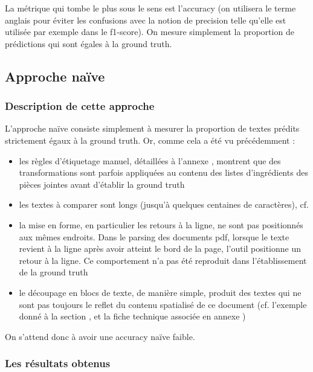         La métrique qui tombe le plus sous le sens est l'accuracy (on utilisera le terme anglais pour éviter les confusions avec la notion de \og precision \fg telle qu'elle est utilisée par exemple dans le f1-score).
        On mesure simplement la proportion de prédictions qui sont égales à la ground truth.

            \subsection{Approche naïve}

                \subsubsection{Description de cette approche}

                L'approche \og naïve \fg consiste simplement à mesurer la proportion de textes prédits strictement égaux à la ground truth.
                Or, comme cela a été vu précédemment : 
                \begin{itemize}
                    \item les règles d'étiquetage manuel, détaillées à l'annexe , montrent que des transformations sont parfois appliquées au contenu des listes d'ingrédients des pièces jointes avant d'établir la ground truth
                    \item les textes à comparer sont longs (jusqu'à quelques centaines de caractères), cf. 
                    \item la mise en forme, en particulier les retours à la ligne, ne sont pas positionnés aux mêmes endroits. Dans le parsing des documents pdf, lorsque le texte revient à la ligne après avoir atteint le bord de la page, l'outil positionne un retour à la ligne. Ce comportement n'a pas été reproduit dans l'établissement de la ground truth
                    \item le découpage en blocs de texte, de manière simple, produit des textes qui ne sont pas toujours le reflet du contenu spatialisé de ce document (cf. l'exemple donné à la section , et la fiche technique associée en annexe )
                \end{itemize}
                On s'attend donc à avoir une \og accuracy naïve \fg faible.

                \subsubsection{Les résultats obtenus}


